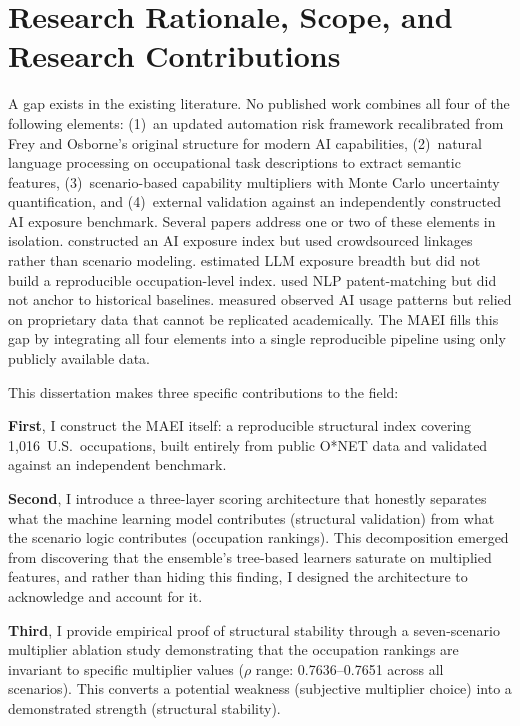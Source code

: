 \section{Research Rationale, Scope, and Research Contributions}
\label{sec:intro-rationale}

A gap exists in the existing literature.  No published work
combines all four of the following elements: (1)~an updated automation risk
framework recalibrated from Frey and Osborne's original structure for modern
AI capabilities, (2)~natural language processing on occupational task
descriptions to extract semantic features, (3)~scenario-based capability
multipliers with Monte Carlo uncertainty quantification, and (4)~external
validation against an independently constructed AI exposure benchmark.
Several papers address one or two of these elements in isolation.
\citet{Felten_Raj_Seamans_2021} constructed an AI exposure index but used
crowdsourced linkages rather than scenario modeling.
\citet{Eloundou_Manning_2023} estimated LLM exposure breadth but did not
build a reproducible occupation-level index.  \citet{Webb_2020} used NLP
patent-matching but did not anchor to historical baselines.
\citet{Anthropic_2026} measured observed AI usage patterns but relied on
proprietary data that cannot be replicated academically.  The MAEI fills
this gap by integrating all four elements into a single reproducible
pipeline using only publicly available data.

This dissertation makes three specific contributions to the field:

\textbf{First}, I construct the MAEI itself: a reproducible structural index
covering 1,016~U.S.\ occupations, built entirely from public O*NET data and
validated against an independent benchmark.

\textbf{Second}, I introduce a three-layer scoring architecture that
honestly separates what the machine learning model contributes (structural
validation) from what the scenario logic contributes (occupation rankings).
This decomposition emerged from discovering that the ensemble's tree-based
learners saturate on multiplied features, and rather than hiding this
finding, I designed the architecture to acknowledge and account for it.

\textbf{Third}, I provide empirical proof of structural stability through a
seven-scenario multiplier ablation study demonstrating that the occupation
rankings are invariant to specific multiplier values ($\rho$ range:
0.7636--0.7651 across all scenarios).  This converts a potential weakness
(subjective multiplier choice) into a demonstrated strength (structural
stability).


